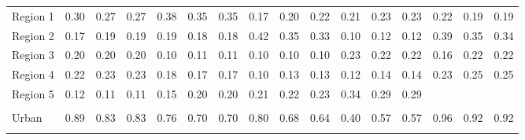 \begin{tabular}{l*{15}{c}}
\\
Region 1 & 0.30 & 0.27 & 0.27 & 0.38 & 0.35 & 0.35 & 0.17 & 0.20 & 0.22 & 0.21 & 0.23 & 0.23 & 0.22 & 0.19 & 0.19 \\
Region 2 & 0.17 & 0.19 & 0.19 & 0.19 & 0.18 & 0.18 & 0.42 & 0.35 & 0.33 & 0.10 & 0.12 & 0.12 & 0.39 & 0.35 & 0.34 \\
Region 3 & 0.20 & 0.20 & 0.20 & 0.10 & 0.11 & 0.11 & 0.10 & 0.10 & 0.10 & 0.23 & 0.22 & 0.22 & 0.16 & 0.22 & 0.22 \\
Region 4 & 0.22 & 0.23 & 0.23 & 0.18 & 0.17 & 0.17 & 0.10 & 0.13 & 0.13 & 0.12 & 0.14 & 0.14 & 0.23 & 0.25 & 0.25 \\
Region 5 & 0.12 & 0.11 & 0.11 & 0.15 & 0.20 & 0.20 & 0.21 & 0.22 & 0.23 & 0.34 & 0.29 & 0.29 & & & \\
\\
Urban & 0.89 & 0.83 & 0.83 & 0.76 & 0.70 & 0.70 & 0.80 & 0.68 & 0.64 & 0.40 & 0.57 & 0.57 & 0.96 & 0.92 & 0.92 \\
\\
\bottomrule
\end{tabular}